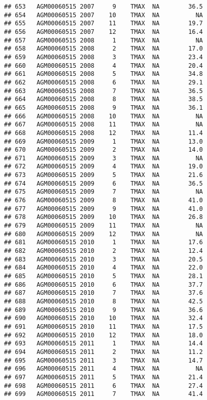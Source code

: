 \documentclass{article}\usepackage[]{graphicx}\usepackage[]{color}
\makeatletter
\newenvironment{kframe}{%
 \def\at@end@of@kframe{}%
 \ifinner\ifhmode%
  \def\at@end@of@kframe{\end{minipage}}%
  \begin{minipage}{\columnwidth}%
 \fi\fi%
 \def\FrameCommand##1{\hskip\@totalleftmargin \hskip-\fboxsep
 \colorbox{shadecolor}{##1}\hskip-\fboxsep
     \hskip-\linewidth \hskip-\@totalleftmargin \hskip\columnwidth}%
 \MakeFramed {\advance\hsize-\width
   \@totalleftmargin\z@ \linewidth\hsize
   \@setminipage}}%
 {\par\unskip\endMakeFramed%
 \at@end@of@kframe}
\newenvironment{knitrout}{}{} %
\makeatother
\begin{document}
\begin{knitrout}
\begin{kframe}
\begin{verbatim}
## 653   AGM00060515 2007     9    TMAX  NA        36.5
## 654   AGM00060515 2007    10    TMAX  NA          NA
## 655   AGM00060515 2007    11    TMAX  NA        19.7
## 656   AGM00060515 2007    12    TMAX  NA        16.4
## 657   AGM00060515 2008     1    TMAX  NA          NA
## 658   AGM00060515 2008     2    TMAX  NA        17.0
## 659   AGM00060515 2008     3    TMAX  NA        23.4
## 660   AGM00060515 2008     4    TMAX  NA        20.4
## 661   AGM00060515 2008     5    TMAX  NA        34.8
## 662   AGM00060515 2008     6    TMAX  NA        29.1
## 663   AGM00060515 2008     7    TMAX  NA        36.5
## 664   AGM00060515 2008     8    TMAX  NA        38.5
## 665   AGM00060515 2008     9    TMAX  NA        36.1
## 666   AGM00060515 2008    10    TMAX  NA          NA
## 667   AGM00060515 2008    11    TMAX  NA          NA
## 668   AGM00060515 2008    12    TMAX  NA        11.4
## 669   AGM00060515 2009     1    TMAX  NA        13.0
## 670   AGM00060515 2009     2    TMAX  NA        14.0
## 671   AGM00060515 2009     3    TMAX  NA          NA
## 672   AGM00060515 2009     4    TMAX  NA        19.0
## 673   AGM00060515 2009     5    TMAX  NA        21.6
## 674   AGM00060515 2009     6    TMAX  NA        36.5
## 675   AGM00060515 2009     7    TMAX  NA          NA
## 676   AGM00060515 2009     8    TMAX  NA        41.0
## 677   AGM00060515 2009     9    TMAX  NA        41.0
## 678   AGM00060515 2009    10    TMAX  NA        26.8
## 679   AGM00060515 2009    11    TMAX  NA          NA
## 680   AGM00060515 2009    12    TMAX  NA          NA
## 681   AGM00060515 2010     1    TMAX  NA        17.6
## 682   AGM00060515 2010     2    TMAX  NA        12.4
## 683   AGM00060515 2010     3    TMAX  NA        20.5
## 684   AGM00060515 2010     4    TMAX  NA        22.0
## 685   AGM00060515 2010     5    TMAX  NA        28.1
## 686   AGM00060515 2010     6    TMAX  NA        37.7
## 687   AGM00060515 2010     7    TMAX  NA        37.6
## 688   AGM00060515 2010     8    TMAX  NA        42.5
## 689   AGM00060515 2010     9    TMAX  NA        36.6
## 690   AGM00060515 2010    10    TMAX  NA        32.4
## 691   AGM00060515 2010    11    TMAX  NA        17.5
## 692   AGM00060515 2010    12    TMAX  NA        18.0
## 693   AGM00060515 2011     1    TMAX  NA        14.4
## 694   AGM00060515 2011     2    TMAX  NA        11.2
## 695   AGM00060515 2011     3    TMAX  NA        14.7
## 696   AGM00060515 2011     4    TMAX  NA          NA
## 697   AGM00060515 2011     5    TMAX  NA        21.4
## 698   AGM00060515 2011     6    TMAX  NA        27.4
## 699   AGM00060515 2011     7    TMAX  NA        41.4

\end{verbatim}
\end{kframe}
\end{knitrout}
\end{document}
